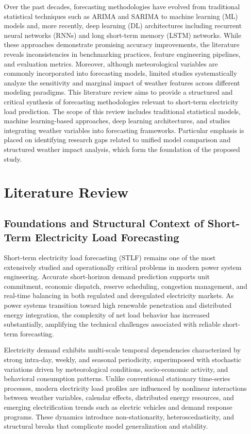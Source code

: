 \documentclass[conference]{IEEEtran}
\begin{document}
\smallskip
Over the past decades, forecasting methodologies have evolved from traditional statistical techniques such as ARIMA and SARIMA to machine learning (ML) models and, more recently, deep learning (DL) architectures including recurrent neural networks (RNNs) and long short-term memory (LSTM) networks. While these approaches demonstrate promising accuracy improvements, the literature reveals inconsistencies in benchmarking practices, feature engineering pipelines, and evaluation metrics. Moreover, although meteorological variables are commonly incorporated into forecasting models, limited studies systematically analyze the sensitivity and marginal impact of weather features across different modeling paradigms.
\smallskip
This literature review aims to provide a structured and critical synthesis of forecasting methodologies relevant to short-term electricity load prediction. The scope of this review includes traditional statistical models, machine learning-based approaches, deep learning architectures, and studies integrating weather variables into forecasting frameworks. Particular emphasis is placed on identifying research gaps related to unified model comparison and structured weather impact analysis, which form the foundation of the proposed study.

\section{Literature Review}
\smallskip

\subsection{Foundations and Structural Context of Short-Term Electricity Load Forecasting}

Short-term electricity load forecasting (STLF) remains one of the most extensively studied and operationally critical problems in modern power system engineering. Accurate short-horizon demand prediction supports unit commitment, economic dispatch, reserve scheduling, congestion management, and real-time balancing in both regulated and deregulated electricity markets. As power systems transition toward high renewable penetration and distributed energy integration, the complexity of net load behavior has increased substantially, amplifying the technical challenges associated with reliable short-term forecasting\cite{10630814}.

Electricity demand exhibits multi-scale temporal dependencies characterized by strong intra-day, weekly, and seasonal periodicity, superimposed with stochastic variations driven by meteorological conditions, socio-economic activity, and behavioral consumption patterns. Unlike conventional stationary time-series processes, modern electricity load profiles are influenced by nonlinear interactions between weather variables, calendar effects, distributed energy resources, and emerging electrification trends such as electric vehicles and demand response programs. These dynamics introduce non-stationarity, heteroscedasticity, and structural breaks that complicate model generalization and stability.
\end{document}
